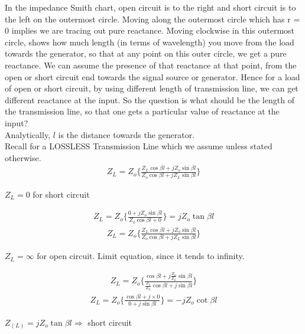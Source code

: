 In the impedance Smith chart, open circuit is to the right and
short circuit is to the left on the outermost circle. Moving along
the outermost circle which has r = 0 implies we are tracing
out pure reactance. Moving clockwise in this outermost circle,
shows how much length (in terms of wavelength) you move from
the load towards the generator, so that at any point on this outer
circle, we get a pure reactance. We can assume the presence of
that reactance at that point, from the open or short circuit end
towards the signal source or generator.
Hence for a load of open or short circuit, by using different length of transmission line, we can get different reactance at the input. So the question is what should be the length of the transmission line, so that one gets a particular value of reactance at the input?\\
Analytically,
$ l $ is the distance towards the generator.\\ Recall for a LOSSLESS Transmission Line which we assume unless stated otherwise.
\begin{align*}
Z_{L} = Z_o \{ \frac{Z_{L}\cos\beta l + jZ_o\sin\beta l}{Z_o\cos\beta l + jZ_{L}\sin\beta l}\}  
\end{align*}
\begin{center}
$Z_{L} = 0$ for short circuit 
\end{center}
\begin{align}
Z_{L} = Z_o \{ \frac{0 + jZ_o\sin\beta l}{Z_o\cos\beta l + 0}\}  = jZ_o\tan\beta l
\end{align}
\begin{align*}
Z_{L} = Z_o \{ \frac{Z_{L}\cos\beta l + jZ_o\sin\beta l}{Z_o\cos\beta l + jZ_{L}\sin\beta l}\}  
\end{align*}
\begin{center}
$Z_{L} = \infty$ for open circuit. Limit equation, since it tends to infinity. 
\end{center}
\begin{align*}
Z_{L} = Z_o \{ \frac{\cos\beta l + j\frac{Z_o}{Z_{L}}\sin\beta l}{\frac{Z_o}{Z_{L}}\cos\beta l + j\sin\beta l}\}  
\end{align*}
\begin{align}
Z_{L} = Z_o \{ \frac{\cos\beta l + j \times 0}{0 + j\sin\beta l}\} = -jZ_o\cot\beta l  
\end{align}
\begin{center}
$ Z_{(L)} = jZ_o\tan\beta l \Rightarrow $ short circuit\\ 
\end{center}

